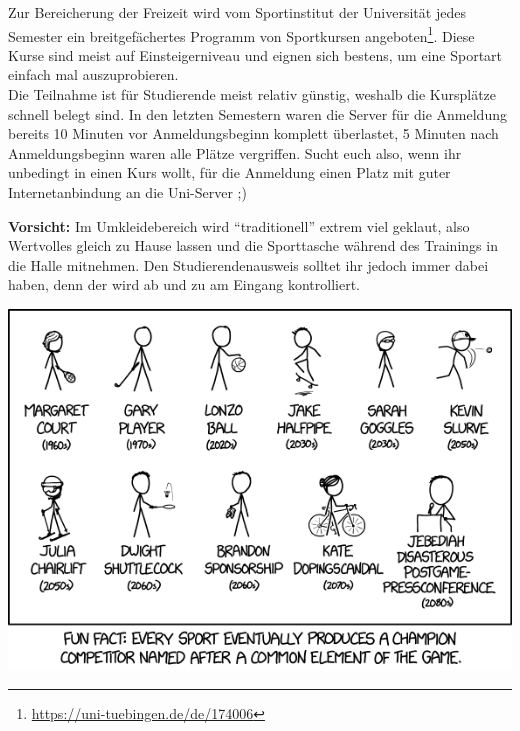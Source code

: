Zur Bereicherung der Freizeit wird vom Sportinstitut der Universität jedes
Semester ein breitgefächertes Programm von Sportkursen
angeboten\footnote{\url{https://uni-tuebingen.de/de/174006}}. Diese Kurse sind
meist auf Einsteigerniveau und eignen sich bestens, um eine Sportart einfach
mal auszuprobieren.\\
Die Teilnahme ist für Studierende meist relativ günstig, weshalb die Kursplätze
schnell belegt sind. 
In den letzten Semestern waren die Server für die
Anmeldung bereits 10 Minuten vor Anmeldungsbeginn komplett überlastet, 5
Minuten nach Anmeldungsbeginn waren alle Plätze vergriffen. Sucht euch also,
wenn ihr unbedingt in einen Kurs wollt, für die Anmeldung einen Platz mit guter
Internetanbindung an die Uni-Server ;)

\textbf{Vorsicht:} Im Umkleidebereich wird "`traditionell"' extrem viel
  geklaut, also Wertvolles gleich
  zu Hause lassen und die Sporttasche wäh\-rend des Trainings in
  die Halle mitnehmen. Den Studierendenausweis solltet ihr jedoch immer dabei haben, 
  denn der wird ab und zu am Eingang kontrolliert.
 

\begin{center}
\includegraphics[width=0.8\hsize]{shared/xkcd/sports_champions.png}
\end{center}

\pagebreak
